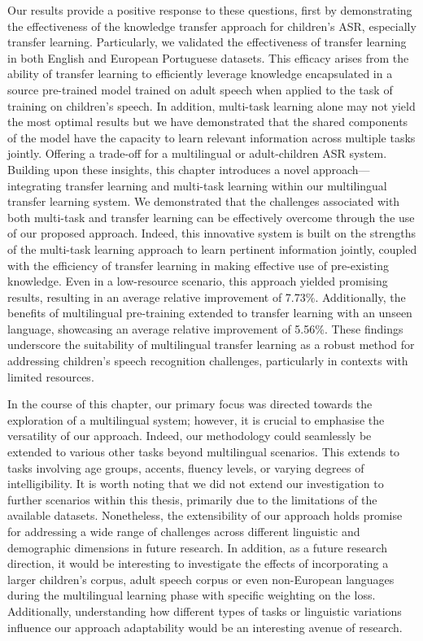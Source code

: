 Our results provide a positive response to these questions, first by demonstrating the effectiveness of the knowledge transfer approach for children's \ac{ASR}, especially transfer learning. Particularly, we validated the effectiveness of transfer learning in both English and European Portuguese datasets. This efficacy arises from the ability of transfer learning to efficiently leverage knowledge encapsulated in a source pre-trained model trained on adult speech when applied to the task of training on children's speech. In addition, multi-task learning alone may not yield the most optimal results but we have demonstrated that the shared components of the model have the capacity to learn relevant information across multiple tasks jointly. Offering a trade-off for a multilingual or adult-children \ac{ASR} system. Building upon these insights, this chapter introduces a novel approach—integrating transfer learning and multi-task learning within our multilingual transfer learning system. We demonstrated that the challenges associated with both multi-task and transfer learning can be effectively overcome through the use of our proposed approach. Indeed, this innovative system is built on the strengths of the multi-task learning approach to learn pertinent information jointly, coupled with the efficiency of transfer learning in making effective use of pre-existing knowledge. Even in a low-resource scenario, this approach yielded promising results, resulting in an average relative improvement of 7.73\%. Additionally, the benefits of multilingual pre-training extended to transfer learning with an unseen language, showcasing an average relative improvement of 5.56\%. These findings underscore the suitability of multilingual transfer learning as a robust method for addressing children's speech recognition challenges, particularly in contexts with limited resources.

In the course of this chapter, our primary focus was directed towards the exploration of a multilingual system; however, it is crucial to emphasise the versatility of our approach. Indeed, our methodology could seamlessly be extended to various other tasks beyond multilingual scenarios. This extends to tasks involving age groups, accents, fluency levels, or varying degrees of intelligibility. It is worth noting that we did not extend our investigation to further scenarios within this thesis, primarily due to the limitations of the available datasets. Nonetheless, the extensibility of our approach holds promise for addressing a wide range of challenges across different linguistic and demographic dimensions in future research. In addition, as a future research direction, it would be interesting to investigate the effects of incorporating a larger children's corpus, adult speech corpus or even non-European languages during the multilingual learning phase with specific weighting on the loss. Additionally, understanding how different types of tasks or linguistic variations influence our approach adaptability would be an interesting avenue of research.

